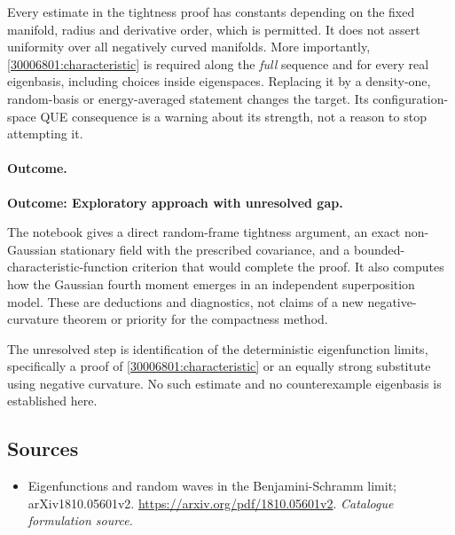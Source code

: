 \documentclass[11pt,a4paper]{article}
\numberwithin{equation}{section}
\begin{document}
Every estimate in the tightness proof has constants depending on the fixed
manifold, radius and derivative order, which is permitted. It does not
assert uniformity over all negatively curved manifolds. More importantly,
\eqref{30006801:characteristic} is required along the \emph{full} sequence and
for every real eigenbasis, including choices inside eigenspaces. Replacing
it by a density-one, random-basis or energy-averaged statement changes the
target. Its configuration-space QUE consequence is a warning about its
strength, not a reason to stop attempting it.

\paragraph{Outcome.}
\textbf{Outcome: Exploratory approach with unresolved gap.}

The notebook gives a direct random-frame tightness argument, an exact
non-Gaussian stationary field with the prescribed covariance, and a
bounded-characteristic-function criterion that would complete the proof.
It also computes how the Gaussian fourth moment emerges in an independent
superposition model. These are deductions and diagnostics, not claims of
a new negative-curvature theorem or priority for the compactness method.

The unresolved step is identification of the deterministic eigenfunction
limits, specifically a proof of \eqref{30006801:characteristic} or an equally
strong substitute using negative curvature. No such estimate and no
counterexample eigenbasis is established here.
\subsection{Sources}
\begin{itemize}\raggedright
\item[\textnormal{[S1]}]\hypertarget{source:30006801:1}{} Eigenfunctions and random waves in the Benjamini-Schramm limit; arXiv1810.05601v2.
\url{https://arxiv.org/pdf/1810.05601v2}.
{\small\textit{Catalogue formulation source.}}
\end{itemize}
\end{document}
